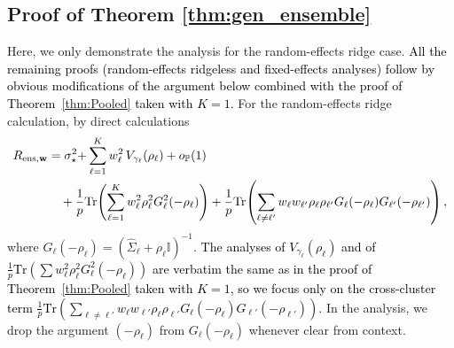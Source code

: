 \documentclass{article}
\theoremstyle{plain}
\theoremstyle{remark}
\def \tr {\mathrm{Tr}}
\def \I{\mathcal{I}}
\def \P{\mathbb{P}}
\def \I {\mathbb{I}}
\begin{document}
\subsection{Proof of Theorem \ref{thm:gen_ensemble}}
Here, we only demonstrate the analysis for the random-effects ridge case. \textcolor{black}{All the remaining proofs (random-effects ridgeless and fixed-effects analyses) follow by obvious modifications of the argument below combined with the proof of Theorem~\ref{thm:Pooled} taken with $K=1$.}
For the random-effects ridge calculation, by direct calculations
\begin{align*}
    R_{\rm ens, \mathbf{w}}
    &=\sigma_\star^2
    \textcolor{black}{+\sum_{\ell=1}^K w_\ell^2\,V_{\gamma_\ell}(\rho_\ell)+o_{\P}(1)}\\
    &\quad+\frac{1}{p}\tr\!\left(\sum_{\ell=1}^K w^2_{\ell}\rho^2_{\ell}G^2_{\ell}(-\rho_{\ell})\right)+\frac{1}{p}\tr\!\left(\sum_{\ell\neq \ell'} w_{\ell}w_{\ell'}\rho_{\ell}\rho_{\ell'}G_{\ell}(-\rho_{\ell})G_{\ell'}(-\rho_{\ell'})\right),
\end{align*}
where $G_{\ell}(-\rho_{\ell})=(\hat{\Sigma}_{\ell}+\rho_{\ell}\I)^{-1}$. \textcolor{black}{The analyses of $V_{\gamma_\ell}(\rho_\ell)$ and of $\frac{1}{p}\tr(\sum w^2_{\ell}\rho^2_{\ell}G^2_{\ell}(-\rho_{\ell}))$ are verbatim the same as in the proof of Theorem~\ref{thm:Pooled} taken with $K=1$, so we focus only on the cross-cluster term $\frac{1}{p}\tr(\sum_{\ell\neq \ell'} w_{\ell}w_{\ell'}\rho_{\ell}\rho_{\ell'}G_{\ell}(-\rho_{\ell})G_{\ell'}(-\rho_{\ell'}))$.}
In the analysis, we drop the argument $(-\rho_{\ell})$ from $G_{\ell}(-\rho_{\ell})$ whenever clear from context.
\end{document}
